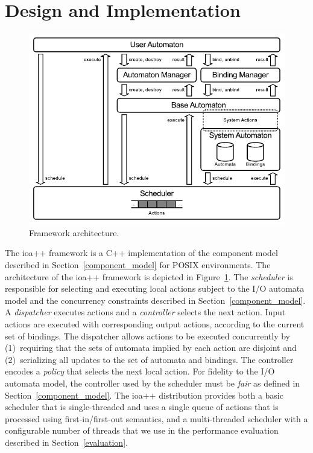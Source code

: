 \section{Design and Implementation\label{design}}

\begin{figure}
\center
\includegraphics[width=.6\columnwidth]{architecture}
\caption{Framework architecture.}
\label{framework_architecture}
\end{figure}

The ioa++ framework is a C++ implementation of the component model described in Section~\ref{component_model} for POSIX environments.
The architecture of the ioa++ framework is depicted in Figure~\ref{framework_architecture}.
The \emph{scheduler} is responsible for selecting and executing local actions subject to the I/O automata model and the concurrency constraints described in Section~\ref{component_model}.
A \emph{dispatcher} executes actions and a \emph{controller} selects the next action.
Input actions are executed with corresponding output actions, according to the current set of bindings.
The dispatcher allows actions to be executed concurrently by (1)~requiring that the sets of automata implied by each action are disjoint and (2)~serializing all updates to the set of automata and bindings.
The controller encodes a \emph{policy} that selects the next local action.
For fidelity to the I/O automata model, the controller used by the scheduler must be \emph{fair} as defined in Section~\ref{component_model}.
The ioa++ distribution provides both a basic scheduler that is single-threaded and uses a single queue of actions that is processed using first-in/first-out semantics, and a multi-threaded scheduler with a configurable number of threads that we use in the performance evaluation described in Section~\ref{evaluation}.


